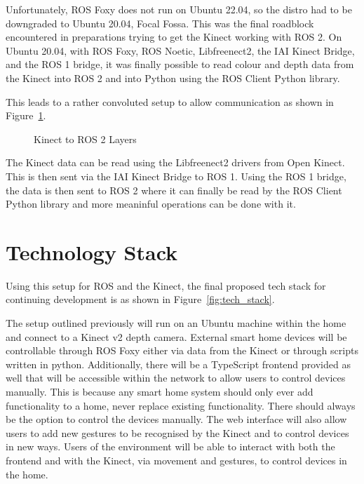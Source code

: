 Unfortunately, ROS Foxy does not run on Ubuntu 22.04, so the distro had to be downgraded to Ubuntu 20.04, Focal Fossa.
This was the final roadblock encountered in preparations trying to get the Kinect working with ROS 2.
On Ubuntu 20.04, with ROS Foxy, ROS Noetic, Libfreenect2, the IAI Kinect Bridge, and the ROS 1 bridge, it was finally possible to read colour and depth data from the Kinect into ROS 2 and into Python using the ROS Client Python library.

This leads to a rather convoluted setup to allow communication as shown in Figure~\ref{fig:kinect_ros}.

\graphicspath{{./images/}}
\begin{figure}[!h]
    \caption{Kinect to ROS 2 Layers}
    \label{fig:kinect_ros}
\end{figure}

The Kinect data can be read using the Libfreenect2 drivers from Open Kinect.
This is then sent via the IAI Kinect Bridge to ROS 1.
Using the ROS 1 bridge, the data is then sent to ROS 2 where it can finally be read by the ROS Client Python library and more meaninful operations can be done with it.

\section{Technology Stack}
Using this setup for ROS and the Kinect, the final proposed tech stack for continuing development is as shown in Figure~\ref{fig:tech_stack}.

The setup outlined previously will run on an Ubuntu machine within the home and connect to a Kinect v2 depth camera.
External smart home devices will be controllable through ROS Foxy either via data from the Kinect or through scripts written in python.
Additionally, there will be a TypeScript frontend provided as well that will be accessible within the network to allow users to control devices manually.
This is because any smart home system should only ever add functionality to a home, never replace existing functionality.
There should always be the option to control the devices manually.
The web interface will also allow users to add new gestures to be recognised by the Kinect and to control devices in new ways.
Users of the environment will be able to interact with both the frontend and with the Kinect, via movement and gestures, to control devices in the home.

